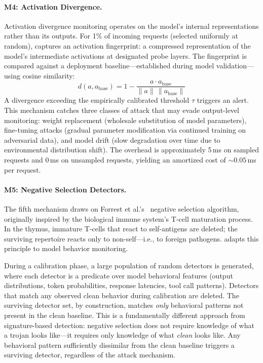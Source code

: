 \paragraph{M4: Activation Divergence.}
Activation divergence monitoring operates on the model's internal
representations rather than its outputs. For 1\% of incoming requests
(selected uniformly at random), \mire captures an activation fingerprint:
a compressed representation of the model's intermediate activations at
designated probe layers. The fingerprint is compared against a deployment
baseline---established during model validation---using cosine similarity:
\[
  d(a, a_{\text{base}}) = 1 - \frac{a \cdot a_{\text{base}}}
  {\|a\| \, \|a_{\text{base}}\|}
\]
A divergence exceeding the empirically calibrated threshold $\tau$ triggers
an alert. This mechanism catches three classes of attack that may evade
output-level monitoring: weight replacement (wholesale substitution of model
parameters), fine-tuning attacks (gradual parameter modification via
continued training on adversarial data), and model drift (slow degradation
over time due to environmental distribution shift). The overhead is
approximately 5\,ms on sampled requests and 0\,ms on unsampled requests,
yielding an amortized cost of ${\sim}0.05$\,ms per request.

\paragraph{M5: Negative Selection Detectors.}
The fifth mechanism draws on Forrest et al.'s~\cite{forrest1994} negative
selection algorithm, originally inspired by the biological immune system's
T-cell maturation process. In the thymus, immature T-cells that react to
self-antigens are deleted; the surviving repertoire reacts only to
non-self---i.e., to foreign pathogens. \mire adapts this principle to
model behavior monitoring.

During a calibration phase, a large population of random detectors is
generated, where each detector is a predicate over model behavioral
features (output distributions, token probabilities, response latencies,
tool call patterns). Detectors that match any observed clean behavior
during calibration are deleted. The surviving detector set, by construction,
matches \emph{only} behavioral patterns not present in the clean baseline.
This is a fundamentally different approach from signature-based detection:
negative selection does not require knowledge of what a trojan looks like---it
requires only knowledge of what \emph{clean} looks like. Any behavioral
pattern sufficiently dissimilar from the clean baseline triggers a surviving
detector, regardless of the attack mechanism.

